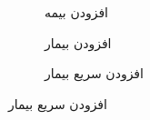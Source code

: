 \documentclass[a4paper,12pt]{report}
\begin{document}
\begin{figure}[!h]
		\begin{subfigure}[t]{0.3\linewidth}
			\caption{
				افزودن بیمه}
		\end{subfigure}\hfill%
		\begin{subfigure}[t]{0.3\linewidth}
			\caption{
				افزودن بیمار}
		\end{subfigure}\hfill%
		\begin{subfigure}[t]{0.3\linewidth}
			\caption{
				افزودن سریع بیمار}
		\end{subfigure}


\end{figure}
\end{document}

